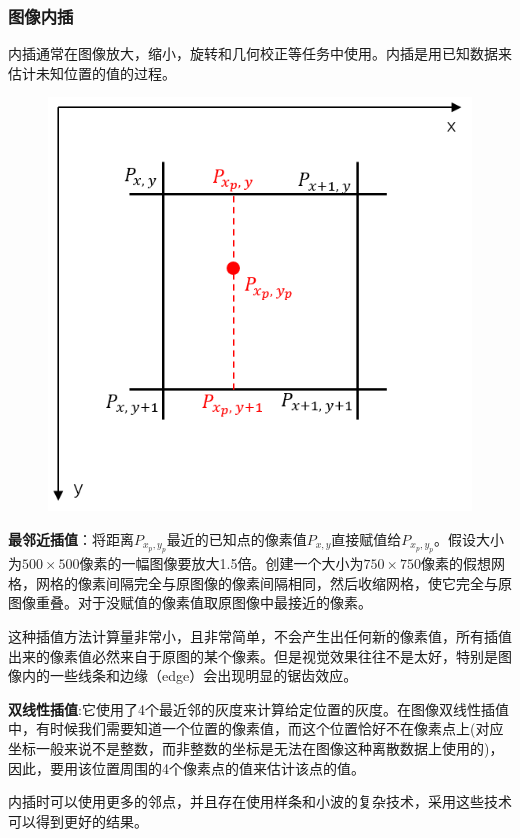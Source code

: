 \documentclass[11pt]{article}
\begin{document}
\subsubsection{图像内插}
内插通常在图像放大，缩小，旋转和几何校正等任务中使用。内插是用已知数据来估计未知位置的值的过程。

\begin{figure}[h]
	\centering
	\includegraphics[scale=0.4]{52}
\end{figure}
\textbf{最邻近插值}：将距离$P_{x_p,y_p}$最近的已知点的像素值$P_{x,y}$直接赋值给$P_{x_p,y_p}$。假设大小为$500\times 500$像素的一幅图像要放大1.5倍。创建一个大小为$750\times 750$像素的假想网格，网格的像素间隔完全与原图像的像素间隔相同，然后收缩网格，使它完全与原图像重叠。对于没赋值的像素值取原图像中最接近的像素。

这种插值方法计算量非常小，且非常简单，不会产生出任何新的像素值，所有插值出来的像素值必然来自于原图的某个像素。但是视觉效果往往不是太好，特别是图像内的一些线条和边缘（edge）会出现明显的锯齿效应。

\textbf{双线性插值}:它使用了4个最近邻的灰度来计算给定位置的灰度。在图像双线性插值中，有时候我们需要知道一个位置的像素值，而这个位置恰好不在像素点上(对应坐标一般来说不是整数，而非整数的坐标是无法在图像这种离散数据上使用的)，因此，要用该位置周围的4个像素点的值来估计该点的值。

内插时可以使用更多的邻点，并且存在使用样条和小波的复杂技术，采用这些技术可以得到更好的结果。
\end{document}
